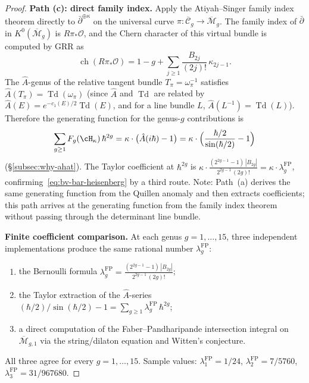 \begin{proof}
\medskip
\noindent\textbf{Path \textup{(c)}: direct family index.}
Apply the Atiyah--Singer family index theorem
directly to $\bar\partial^{\oplus\kappa}$
on the universal curve $\pi \colon \overline{\mathcal{C}}_g
\to \overline{\mathcal{M}}_g$.
The family index of $\bar\partial$ in
$K^0(\overline{\mathcal{M}}_g)$ is $R\pi_*\mathcal{O}$,
and the Chern character of this virtual bundle is computed by GRR as
\[
\operatorname{ch}(R\pi_*\mathcal{O})
= 1 - g + \sum_{j \geq 1}
\frac{B_{2j}}{(2j)!}\,\kappa_{2j-1}.
\]
The $\hat{A}$-genus of the relative tangent bundle
$T_\pi = \omega_\pi^{-1}$ satisfies
$\hat{A}(T_\pi) = \operatorname{Td}(\omega_\pi)$
(since $\hat{A}$ and $\operatorname{Td}$ are related by
$\hat{A}(E) = e^{-c_1(E)/2}\operatorname{Td}(E)$, and for
a line bundle $L$,
$\hat{A}(L^{-1}) = \operatorname{Td}(L)$).
Therefore the generating function for the genus-$g$ contributions is
\[
\sum_{g \geq 1} F_g(\cH_\kappa)\,\hbar^{2g}
= \kappa \cdot \bigl(\hat{A}(i\hbar) - 1\bigr)
= \kappa \cdot \Bigl(\frac{\hbar/2}{\sin(\hbar/2)} - 1\Bigr)
\]
\textup{(}\S\ref{subsec:why-ahat}\textup{)}.
The Taylor coefficient at $\hbar^{2g}$ is
$\kappa \cdot \frac{(2^{2g-1}-1)\,|B_{2g}|}{2^{2g-1}\,(2g)!}
= \kappa \cdot \lambda_g^{\mathrm{FP}}$,
confirming~\eqref{eq:bv-bar-heisenberg} by a third route.
Note: Path~\textup{(a)} derives the same generating function
from the Quillen anomaly and then extracts coefficients; this path
arrives at the generating function from the family index theorem
without passing through the determinant line bundle.

\medskip
\noindent\textbf{Finite coefficient comparison.}
At each genus $g = 1, \ldots, 15$, three independent
implementations produce the same rational number $\lambda_g^{\mathrm{FP}}$:
\begin{enumerate}[label=\textup{(\roman*)},nosep]
\item the Bernoulli formula
 $\lambda_g^{\mathrm{FP}}
 = \frac{(2^{2g-1}-1)\,|B_{2g}|}{2^{2g-1}\,(2g)!}$;
\item the Taylor extraction of the $\hat{A}$-series
 $(\hbar/2)/\sin(\hbar/2) - 1
 = \sum_{g \geq 1} \lambda_g^{\mathrm{FP}}\,\hbar^{2g}$;
\item a direct computation of the Faber--Pandharipande
 intersection integral on $\overline{\mathcal{M}}_{g,1}$
 via the string/dilaton equation and Witten's conjecture.
\end{enumerate}
All three agree for every $g=1,\ldots,15$. Sample values:
$\lambda_1^{\mathrm{FP}} = 1/24$,
$\lambda_2^{\mathrm{FP}} = 7/5760$,
$\lambda_3^{\mathrm{FP}} = 31/967680$.
\end{proof}

